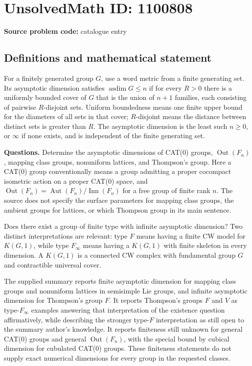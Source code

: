 \documentclass[11pt]{article}
\begin{document}
\section*{UnsolvedMath ID: 1100808}
\textbf{Source problem code:} catalogue entry
\subsection{Definitions and mathematical statement}
For a finitely generated group $G$, use a word metric from a finite generating set. Its asymptotic dimension satisfies $\operatorname{asdim}G\leq n$ if for every $R>0$ there is a uniformly bounded cover of $G$ that is the union of $n+1$ families, each consisting of pairwise $R$-disjoint sets. Uniform boundedness means one finite upper bound for the diameters of all sets in that cover; $R$-disjoint means the distance between distinct sets is greater than $R$. The asymptotic dimension is the least such $n\geq0$, or $\infty$ if none exists, and is independent of the finite generating set.

\textbf{Questions.} Determine the asymptotic dimensions of CAT(0) groups, $\operatorname{Out}(F_n)$, mapping class groups, nonuniform lattices, and Thompson's group. Here a CAT(0) group conventionally means a group admitting a proper cocompact isometric action on a proper CAT(0) space, and $\operatorname{Out}(F_n)=\operatorname{Aut}(F_n)/\operatorname{Inn}(F_n)$ for a free group of finite rank $n$. The source does not specify the surface parameters for mapping class groups, the ambient groups for lattices, or which Thompson group in its main sentence.

Does there exist a group of finite type with infinite asymptotic dimension? Two distinct interpretations are relevant: type $F$ means having a finite CW model for $K(G,1)$, while type $F_{\infty}$ means having a $K(G,1)$ with finite skeleton in every dimension. A $K(G,1)$ is a connected CW complex with fundamental group $G$ and contractible universal cover.

The supplied summary reports finite asymptotic dimension for mapping class groups and nonuniform lattices in semisimple Lie groups, and infinite asymptotic dimension for Thompson's group $F$. It reports Thompson's groups $F$ and $V$ as type-$F_{\infty}$ examples answering that interpretation of the existence question affirmatively, while describing the stronger type-$F$ interpretation as still open to the summary author's knowledge. It reports finiteness still unknown for general CAT(0) groups and general $\operatorname{Out}(F_n)$, with the special bound by cubical dimension for cubulated CAT(0) groups. These finiteness statements do not supply exact numerical dimensions for every group in the requested classes.
\end{document}
